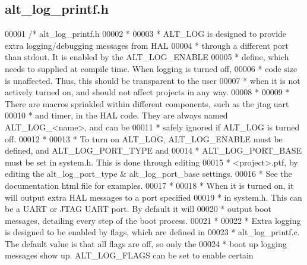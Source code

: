 \subsection{alt\+\_\+log\+\_\+printf.\+h}
\label{alt__log__printf_8h_source}

\begin{DoxyCode}
00001 \textcolor{comment}{/*  alt\_log\_printf.h}
00002 \textcolor{comment}{ *}
00003 \textcolor{comment}{ *  ALT\_LOG is designed to provide extra logging/debugging messages from HAL}
00004 \textcolor{comment}{ *  through a different port than stdout.  It is enabled by the ALT\_LOG\_ENABLE}
00005 \textcolor{comment}{ *  define, which needs to supplied at compile time.  When logging is turned off, }
00006 \textcolor{comment}{ *  code size is unaffected.  Thus, this should be transparent to the user}
00007 \textcolor{comment}{ *  when it is not actively turned on, and should not affect projects in any way.}
00008 \textcolor{comment}{ *}
00009 \textcolor{comment}{ *  There are macros sprinkled within different components, such as the jtag uart }
00010 \textcolor{comment}{ *  and timer, in the HAL code.  They are always named ALT\_LOG\_<name>, and can be}
00011 \textcolor{comment}{ *  safely ignored if ALT\_LOG is turned off. }
00012 \textcolor{comment}{ *}
00013 \textcolor{comment}{ *  To turn on ALT\_LOG, ALT\_LOG\_ENABLE must be defined, and ALT\_LOG\_PORT\_TYPE and}
00014 \textcolor{comment}{ *  ALT\_LOG\_PORT\_BASE must be set in system.h.  This is done through editing }
00015 \textcolor{comment}{ *  <project>.ptf, by editing the alt\_log\_port\_type & alt\_log\_port\_base settings.}
00016 \textcolor{comment}{ *  See the documentation html file for examples.}
00017 \textcolor{comment}{ *}
00018 \textcolor{comment}{ *  When it is turned on, it will output extra HAL messages to a port specified}
00019 \textcolor{comment}{ *  in system.h.  This can be a UART or JTAG UART port.  By default it will }
00020 \textcolor{comment}{ *  output boot messages, detailing every step of the boot process.  }
00021 \textcolor{comment}{ *}
00022 \textcolor{comment}{ *  Extra logging is designed to be enabled by flags, which are defined in }
00023 \textcolor{comment}{ *  alt\_log\_printf.c.  The default value is that all flags are off, so only the}
00024 \textcolor{comment}{ *  boot up logging messages show up.  ALT\_LOG\_FLAGS can be set to enable certain}

\end{DoxyCode}
